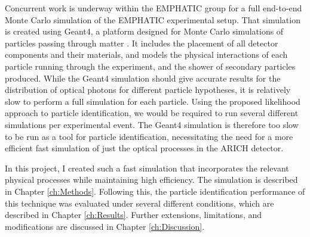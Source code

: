 Concurrent work is underway within the EMPHATIC group for a full end-to-end Monte Carlo simulation of the EMPHATIC experimental setup.
That simulation is created using Geant4, a platform designed for Monte Carlo simulations of particles passing through matter \cite{geant4}.
It includes the placement of all detector components and their materials, and models the physical interactions of each particle running through the experiment, and the shower of secondary particles produced.
While the Geant4 simulation should give accurate results for the distribution of optical photons for different particle hypotheses, it is relatively slow to perform a full simulation for each particle.
Using the proposed likelihood approach to particle identification, we would be required to run several different simulations per experimental event.
The Geant4 simulation is therefore too slow to be run as a tool for particle identification, necessitating the need for a more efficient fast simulation of just the optical processes in the ARICH detector. 

In this project, I created such a fast simulation that incorporates the relevant physical processes while maintaining high efficiency.
The simulation is described in Chapter \ref{ch:Methods}.
Following this, the particle identification performance of this technique was evaluated under several different conditions, which are described in Chapter \ref{ch:Results}.
Further extensions, limitations, and modifications are discussed in Chapter \ref{ch:Discussion}.

\endinput

Any text after an \endinput is ignored.
You could put scraps here or things in progress.
